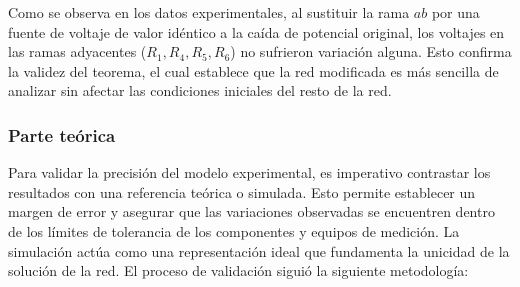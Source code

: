 Como se observa en los datos experimentales, al sustituir la rama $ab$ por una fuente de voltaje de valor idéntico a la caída de potencial original, los voltajes en las ramas adyacentes ($R_1, R_4, R_5, R_6$) no sufrieron variación alguna. Esto confirma la validez del teorema, el cual establece que la red modificada es más sencilla de analizar sin afectar las condiciones iniciales del resto de la red. 


\subsubsection{Parte teórica}

Para validar la precisión del modelo experimental, es imperativo contrastar los resultados con una referencia teórica o simulada. Esto permite establecer un margen de error y asegurar que las variaciones observadas se encuentren dentro de los límites de tolerancia de los componentes y equipos de medición. La simulación actúa como una representación ideal que fundamenta la unicidad de la solución de la red. El proceso de validación siguió la siguiente metodología:

